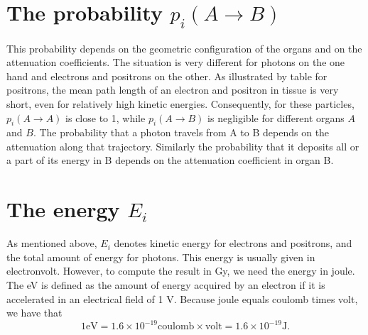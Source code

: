 \section{The probability $p_i(A \rightarrow B)$}
This probability depends on the geometric configuration of the organs
and on the attenuation coefficients. The situation is very different
for photons on the one hand and electrons and positrons on the
other. As illustrated by table  for
positrons, the mean path length of an electron and positron in tissue
is very short, even for relatively high kinetic
energies. Consequently, for these particles, $p_i(A \rightarrow A)$ is
close to 1, while $p_i(A \rightarrow B)$ is negligible for different
organs $A$ and $B$. The probability that a photon travels from A to B
depends on the attenuation along that trajectory. Similarly the
probability that it deposits all or a part of its energy in B depends
on the attenuation coefficient in organ B.


\section{The energy $E_i$}
As mentioned above, $E_i$ denotes kinetic energy for electrons and positrons,
and the total amount of energy for photons. This energy is usually given in
electronvolt. However, to compute the result in Gy, we need the energy in joule.
The eV is defined as the amount of energy acquired by an electron if it
is accelerated in an electrical field of 1 V. Because joule equals coulomb
times volt, we have that
\begin{equation}
 1 \mbox{eV} = 1.6 \times 10^{-19} \mbox{coulomb} \times \mbox{volt}
             = 1.6 \times 10^{-19} \mbox{J}.
\end{equation}


